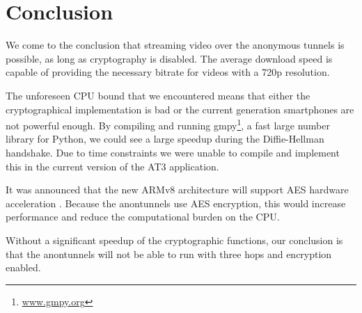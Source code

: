 \section{Conclusion}
\label{sec:experiments:conclusion}
	We come to the conclusion that streaming video over the anonymous tunnels is possible, as long as cryptography is disabled. The average download speed is capable of providing the necessary bitrate for videos with a 720p resolution. %
	
	The unforeseen CPU bound that we encountered means that either the cryptographical implementation is bad or the current generation smartphones are not powerful enough. By compiling and running gmpy\footnote{\href{http://www.gmpy.org/}{www.gmpy.org}}, a fast large number library for Python, we could see a large speedup during the Diffie-Hellman handshake. Due to time constraints we were unable to compile and implement this in the current version of the AT3 application.
	
	It was announced that the new ARMv8 architecture will support AES hardware acceleration \cite{armv8anouncement}. Because the anontunnels use AES encryption, this would increase performance and reduce the computational burden on the CPU. %
	
	Without a significant speedup of the cryptographic functions, our conclusion is that the anontunnels will not be able to run with three hops and encryption enabled.